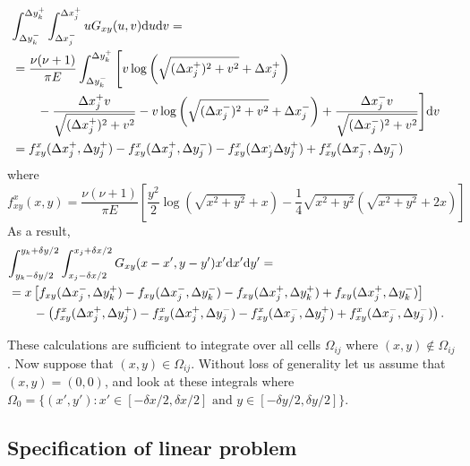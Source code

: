 \documentclass{article}
\newcommand{\dd}{\mathrm{d}}
\begin{document}
\begin{description}
\begin{align}
\lefteqn{\int_{\Delta y_{k}^-}^{\Delta y_k^+}  \int_{\Delta x_j^-}^{\Delta x_j^+} uG_{xy}(u,v)\dd u \dd v =}\nonumber\\
&=\frac{\nu(\nu+1)}{\pi E}\int_{\Delta y_{k}^-}^{\Delta y_k^+} \Bigg[ v\log\left( \sqrt{ (\Delta x_j^+)^2 + v^2} + \Delta x_j^+ \right)  \nonumber\\
&\qquad- \frac{\Delta x_j^+ v}{\sqrt{ (\Delta x_j^+)^2 + v^2} } - v\log\left( \sqrt{ (\Delta x_j^-)^2 + v^2} + \Delta x_j^- \right) +\frac{\Delta x_j^- v}{\sqrt{ (\Delta x_j^-)^2 + v^2} } \Bigg] \dd v \nonumber\\
&= f_{xy}^x(\Delta x_j^+,\Delta y_j^+) - f_{xy}^x(\Delta x_j^+,\Delta y_j^-) - f_{xy}^x(\Delta x_j^,\Delta y_j^+) + f_{xy}^x(\Delta x_j^-,\Delta y_j^-)
\end{align} 
where
\begin{equation}
f_{xy}^x(x,y) =\frac{\nu(\nu+1)}{\pi E}\left[ \frac{y^2}{2}\log\left(\sqrt{x^2+y^2} +x \right) -\frac{1}{4}\sqrt{x^2+y^2}\left(\sqrt{x^2+y^2}+2x\right) \right]
\end{equation}
As a result,
\begin{align}
\lefteqn{\int_{y_k-\delta y/2}^{y_k+\delta y/2}  \int_{x_j-\delta x/2}^{x_j+\delta x/2} G_{xy}(x-x',y-y') x' \dd x'  \dd y'= } \nonumber\\
&=x\left[ f_{xy}(\Delta x_j^-, \Delta y_k^+) - f_{xy}(\Delta x_j^-,\Delta y_k^-) - f_{xy}(\Delta x_j^+,\Delta y_k^+) + f_{xy} (\Delta x_j^+,\Delta y_k^-) \right]\nonumber\\
&\qquad -   \left( f_{xy}^x(\Delta x_j^+,\Delta y_j^+) - f_{xy}^x(\Delta x_j^+,\Delta y_j^-) - f_{xy}^x(\Delta x_j^-,\Delta y_j^+) + f_{xy}^x(\Delta x_j^-,\Delta y_j^-)\right).
\end{align}

\end{description}

These calculations are sufficient to integrate over all cells $\Omega_{ij}$ where $(x,y)\not\in\Omega_{ij}$. Now suppose that $(x,y)\in\Omega_{ij}$. Without loss of generality let us assume that $(x,y)=(0,0)$, and look at these integrals where $\Omega_0 = \{ (x',y') : x'\in[-\delta x/2,\delta x/2] \textrm{ and } y\in[-\delta y/2,\delta y/2] \}$.

\subsection{Specification of linear problem}
\end{document}
